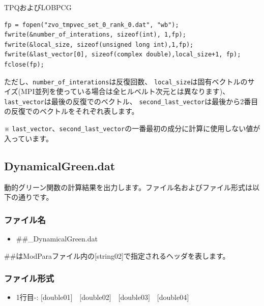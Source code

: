 TPQおよびLOBPCG
\\
\begin{minipage}{16cm}
\begin{screen}
\begin{verbatim}
fp = fopen("zvo_tmpvec_set_0_rank_0.dat", "wb");
fwrite(&number_of_interations, sizeof(int), 1,fp);
fwrite(&local_size, sizeof(unsigned long int),1,fp);
fwrite(&last_vector[0], sizeof(complex double),local_size+1, fp);
fclose(fp);
\end{verbatim}
\end{screen}
\end{minipage}
ただし、\verb|number_of_interations|は反復回数、
\verb|local_size|は固有ベクトルのサイズ(MPI並列を使っている場合は全ヒルベルト次元とは異なります)、
\verb|last_vector|は最後の反復でのベクトル、
\verb|second_last_vector|は最後から2番目の反復でのベクトルをそれぞれ表します。

※ \verb|last_vector|、\verb|second_last_vector|の一番最初の成分に計算に使用しない値が入っています。

\newpage
\subsection{{DynamicalGreen.dat}}
\label{Subsec:dynamicalG}
動的グリーン関数の計算結果を出力します。ファイル名およびファイル形式は以下の通りです。

\subsubsection{ファイル名}
\begin{itemize}
   \item{\#\#\_DynamicalGreen.dat}
\end{itemize}
  \#\#はModParaファイル内の[string02]で指定されるヘッダを表します。
  
\subsubsection{ファイル形式}
 \begin{itemize}
   \item  1行目-: $[$double01$]$~~$[$double02$]$~~$[$double03$]$~~$[$double04$]$
  \end{itemize}
